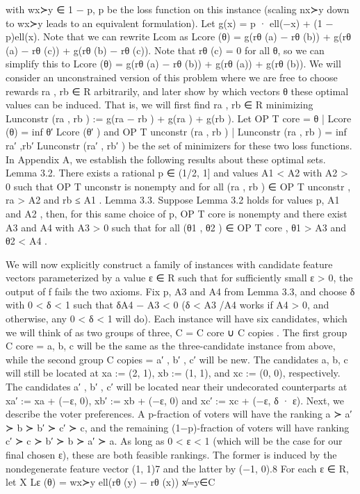 \documentclass[10pt]{article}
\begin{document}
\begin{ReviewVerbatim}
with wx≻y ∈ {1 − p, p} be the loss function on this instance (scaling nx≻y down to wx≻y leads to
an equivalent formulation). Let g(x) = p · ell(−x) + (1 − p)ell(x). Note that we can rewrite Lcom as
                    Lcore (θ) = g(rθ (a) − rθ (b)) + g(rθ (a) − rθ (c)) + g(rθ (b) − rθ (c)).
Note that rθ (c) = 0 for all θ, so we can simplify this to
                              Lcore (θ) = g(rθ (a) − rθ (b)) + g(rθ (a)) + g(rθ (b)).
We will consider an unconstrained version of this problem where we are free to choose rewards
ra , rb ∈ R arbitrarily, and later show by which vectors θ these optimal values can be induced. That
is, we will first find ra , rb ∈ R minimizing
                                Lunconstr (ra , rb ) := g(ra − rb ) + g(ra ) + g(rb ).
Let OP T core = {θ | Lcore (θ) = inf θ′ Lcore (θ′ )} and OP T unconstr {(ra , rb ) | Lunconstr (ra , rb ) =
inf ra′ ,rb′ Lunconstr (ra′ , rb′ )} be the set of minimizers for these two loss functions. In Appendix A, we
establish the following results about these optimal sets.
Lemma 3.2. There exists a rational p ∈ (1/2, 1] and values A1 < A2 with A2 > 0 such that
OP T unconstr is nonempty and for all (ra , rb ) ∈ OP T unconstr , ra > A2 and rb ≤ A1 .
Lemma 3.3. Suppose Lemma 3.2 holds for values p, A1 and A2 , then, for this same choice of p,
OP T core is nonempty and there exist A3 and A4 with A3 > 0 such that for all (θ1 , θ2 ) ∈ OP T core ,
θ1 > A3 and θ2 < A4 .

We will now explicitly construct a family of instances with candidate feature vectors parameterized
by a value ε ∈ R such that for sufficiently small ε > 0, the output of f fails the two axioms. Fix
p, A3 and A4 from Lemma 3.3, and choose δ with 0 < δ < 1 such that δA4 − A3 < 0 (δ < A3 /A4
works if A4 > 0, and otherwise, any 0 < δ < 1 will do).
Each instance will have six candidates, which we will think of as two groups of three, C = C core ∪
C copies . The first group C core = {a, b, c} will be the same as the three-candidate instance from
above, while the second group C copies = {a′ , b′ , c′ } will be new. The candidates a, b, c will still be
located at xa := (2, 1), xb := (1, 1), and xc := (0, 0), respectively. The candidates a′ , b′ , c′ will
be located near their undecorated counterparts at xa′ := xa + (−ε, 0), xb′ := xb + (−ε, 0) and
xc′ := xc + (−ε, δ · ε).
Next, we describe the voter preferences. A p-fraction of voters will have the ranking a ≻ a′ ≻ b ≻
b′ ≻ c′ ≻ c, and the remaining (1−p)-fraction of voters will have ranking c′ ≻ c ≻ b′ ≻ b ≻ a′ ≻ a.
As long as 0 < ε < 1 (which will be the case for our final chosen ε), these are both feasible rankings.
The former is induced by the nondegenerate feature vector (1, 1)7 and the latter by (−1, 0).8
For each ε ∈ R, let                                 X
                                      Lε (θ) =             wx≻y ell(rθ (y) − rθ (x))
                                                  x̸=y∈C


\end{ReviewVerbatim}
\end{document}
